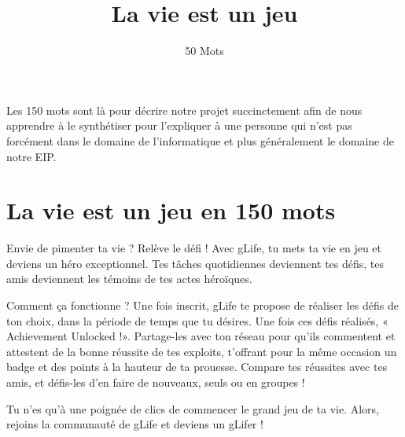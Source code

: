 \documentclass{life-fr}
\begin{document}
\title{La vie est un jeu}
\subtitle{50 Mots}

\summary
{
  Les 150 mots sont là pour décrire notre projet succinctement
  afin de nous apprendre à le synthétiser pour l'expliquer à
  une personne qui n'est pas forcément dans le domaine de
  l'informatique et plus généralement le domaine de notre EIP.
}

\maketitle


\chapter{La vie est un jeu en 150 mots}

Envie de pimenter ta vie ? Relève le défi ! Avec gLife, tu mets ta vie en jeu et deviens un héro exceptionnel.
Tes tâches quotidiennes deviennent tes défis, tes amis deviennent les témoins de tes actes héroïques.

Comment ça fonctionne ? Une fois inscrit, gLife te propose de réaliser les défis de ton choix,
dans la période de temps que tu désires. Une fois ces défis réalisés,
« Achievement Unlocked !». Partage-les avec ton réseau pour qu’ils commentent et attestent
de la bonne réussite de tes exploits, t’offrant pour la même occasion un badge et des points
à la hauteur de ta prouesse. Compare tes réussites avec tes amis,
et défis-les d’en faire de nouveaux, seuls ou en groupes !

Tu n’es qu’à une poignée de clics de commencer le grand jeu de ta vie.
Alors, rejoins la communauté de gLife et deviens un gLifer !
\end{document}
